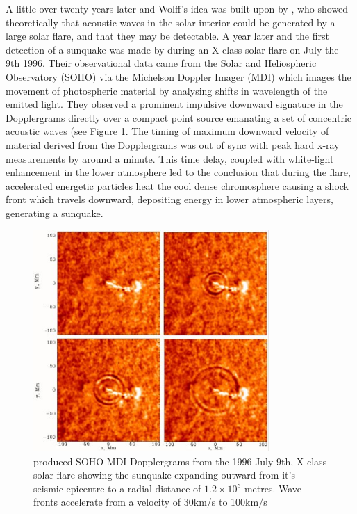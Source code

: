 A little over twenty years later and Wolff's idea was built upon by \cite{1995ESASP.376b.341K}, who showed theoretically that acoustic waves in the solar interior could be generated by a large solar flare, and that they may be detectable. A year later and the first detection of a sunquake was made by \cite{1998Natur.393..317K} during an X class solar flare on July the 9th 1996. Their observational data came from the Solar and Heliospheric Observatory (SOHO) via the Michelson Doppler Imager (MDI) which images the movement of photospheric material by analysing shifts in wavelength of the emitted light. They observed a prominent impulsive downward signature in the Dopplergrams directly over a compact point source emanating a set of concentric acoustic waves (see Figure \ref{mdiquake96}. The timing of maximum downward velocity of material derived from the Dopplergrams was out of sync with peak hard x-ray measurements by around a minute. This time delay, coupled with white-light enhancement in the lower atmosphere led to the conclusion that during the flare, accelerated energetic particles heat the cool dense chromosphere causing a shock front which travels downward, depositing energy in lower atmospheric layers, generating a sunquake. 
 
\begin{figure}[hb]
  \begin{center}
  \includegraphics[width=0.80\textwidth]{soho-mdi-quake-96}  
\caption{\cite{1998Natur.393..317K} produced SOHO MDI Dopplergrams from the 1996 July 9th, X class solar flare showing the sunquake expanding outward from it's seismic epicentre to a radial distance of $1.2\times10^{8}$ metres. Wave-fronts accelerate from a velocity of 30km/s to 100km/s}\label{mdiquake96}
\end{center}
\end{figure}


